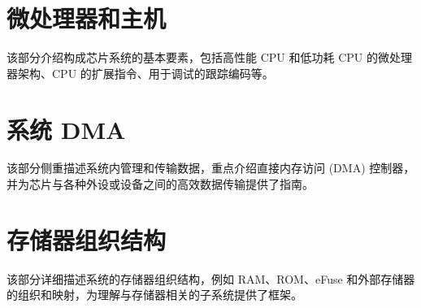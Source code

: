 \documentclass[openany, 10pt]{book}
\begin{document}
\setchineseformatting





\clearpage

\clearpage


\tableofcontents
\clearpage
\listoftables
\clearpage
\listoffigures





\part{微处理器和主机}


该部分介绍构成芯片系统的基本要素，包括高性能 CPU 和低功耗 CPU 的微处理器架构、CPU 的扩展指令、用于调试的跟踪编码等。


\part{系统 DMA}


该部分侧重描述系统内管理和传输数据，重点介绍直接内存访问 (DMA) 控制器，并为芯片与各种外设或设备之间的高效数据传输提供了指南。


\part{存储器组织结构}

该部分详细描述系统的存储器组织结构，例如 RAM、ROM、eFuse 和外部存储器的组织和映射，为理解与存储器相关的子系统提供了框架。
\end{document}
